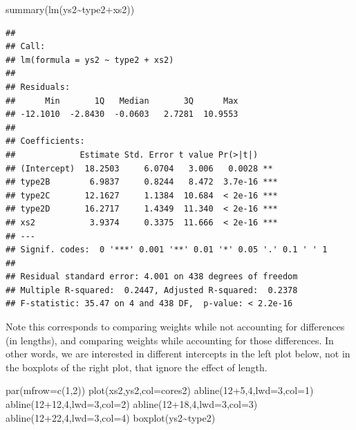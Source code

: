 \documentclass[
]{book}
\newenvironment{Shaded}{\begin{snugshade}}{\end{snugshade}}
\newcommand{\AttributeTok}[1]{\textcolor[rgb]{0.77,0.63,0.00}{#1}}
\newcommand{\DecValTok}[1]{\textcolor[rgb]{0.00,0.00,0.81}{#1}}
\newcommand{\FunctionTok}[1]{\textcolor[rgb]{0.00,0.00,0.00}{#1}}
\newcommand{\NormalTok}[1]{#1}
\newcommand{\SpecialCharTok}[1]{\textcolor[rgb]{0.00,0.00,0.00}{#1}}
\begin{document}
\begin{Shaded}
\begin{Highlighting}[]
\FunctionTok{summary}\NormalTok{(}\FunctionTok{lm}\NormalTok{(ys2}\SpecialCharTok{\textasciitilde{}}\NormalTok{type2}\SpecialCharTok{+}\NormalTok{xs2))}
\end{Highlighting}
\end{Shaded}

\begin{verbatim}
## 
## Call:
## lm(formula = ys2 ~ type2 + xs2)
## 
## Residuals:
##      Min       1Q   Median       3Q      Max 
## -12.1010  -2.8430  -0.0603   2.7281  10.9553 
## 
## Coefficients:
##             Estimate Std. Error t value Pr(>|t|)    
## (Intercept)  18.2503     6.0704   3.006   0.0028 ** 
## type2B        6.9837     0.8244   8.472  3.7e-16 ***
## type2C       12.1627     1.1384  10.684  < 2e-16 ***
## type2D       16.2717     1.4349  11.340  < 2e-16 ***
## xs2           3.9374     0.3375  11.666  < 2e-16 ***
## ---
## Signif. codes:  0 '***' 0.001 '**' 0.01 '*' 0.05 '.' 0.1 ' ' 1
## 
## Residual standard error: 4.001 on 438 degrees of freedom
## Multiple R-squared:  0.2447, Adjusted R-squared:  0.2378 
## F-statistic: 35.47 on 4 and 438 DF,  p-value: < 2.2e-16
\end{verbatim}

Note this corresponds to comparing weights while not accounting for differences (in lengths), and comparing weights while accounting for those differences. In other words, we are interested in different intercepts in the left plot below, not in the boxplots of the right plot, that ignore the effect of length.

\begin{Shaded}
\begin{Highlighting}[]
\FunctionTok{par}\NormalTok{(}\AttributeTok{mfrow=}\FunctionTok{c}\NormalTok{(}\DecValTok{1}\NormalTok{,}\DecValTok{2}\NormalTok{))}
\FunctionTok{plot}\NormalTok{(xs2,ys2,}\AttributeTok{col=}\NormalTok{cores2)}
\FunctionTok{abline}\NormalTok{(}\DecValTok{12}\SpecialCharTok{+}\DecValTok{5}\NormalTok{,}\DecValTok{4}\NormalTok{,}\AttributeTok{lwd=}\DecValTok{3}\NormalTok{,}\AttributeTok{col=}\DecValTok{1}\NormalTok{)}
\FunctionTok{abline}\NormalTok{(}\DecValTok{12}\SpecialCharTok{+}\DecValTok{12}\NormalTok{,}\DecValTok{4}\NormalTok{,}\AttributeTok{lwd=}\DecValTok{3}\NormalTok{,}\AttributeTok{col=}\DecValTok{2}\NormalTok{)}
\FunctionTok{abline}\NormalTok{(}\DecValTok{12}\SpecialCharTok{+}\DecValTok{18}\NormalTok{,}\DecValTok{4}\NormalTok{,}\AttributeTok{lwd=}\DecValTok{3}\NormalTok{,}\AttributeTok{col=}\DecValTok{3}\NormalTok{)}
\FunctionTok{abline}\NormalTok{(}\DecValTok{12}\SpecialCharTok{+}\DecValTok{22}\NormalTok{,}\DecValTok{4}\NormalTok{,}\AttributeTok{lwd=}\DecValTok{3}\NormalTok{,}\AttributeTok{col=}\DecValTok{4}\NormalTok{)}
\FunctionTok{boxplot}\NormalTok{(ys2}\SpecialCharTok{\textasciitilde{}}\NormalTok{type2)}
\end{Highlighting}
\end{Shaded}
\end{document}
